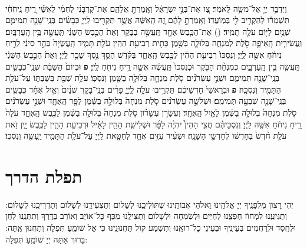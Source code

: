 \documentclass[twoside, openany, parskip=half, 11pt]{book}
\begin{document}
\begin{footnotesize}
\begin{multicols}{2}
\\
וַיְדַבֵּ֥ר יְיָ֖ אֶל־משֶׂ֥ה לֵּאמֹֽר׃ צַ֚ו אֶת־בְּנֵ֣י יִשְׂרָאֵ֔ל וְאָֽמַרְתָּ֖ אֲלֵהֶ֑ם אֶת־קָרְבָּנִ֨י לַחְמִ֜י לְאִשַּׁ֗י רֵ֚יחַ נִֽיחֹחִ֔י תִּשְׁמְר֕וּ לְהַקְרִ֥יב לִ֖י בְּמֽוֹעֲדֽוֹ׃ 
 וְאָֽמַרְתָּ֣ לָהֶ֔ם זֶ֚ה הָֽאִשֶּׁ֔ה אֲשֶׁ֥ר תַּקְרִ֖יבוּ לַֽיְיָ֑ כְּבָשִׂ֨ים בְּנֵֽי־שָׁנָ֧ה תְמִימִ֛ם שְׁנַ֥יִם לַיּ֖וֹם עֹלָ֥ה תָמִֽיד׃ 
 ()
 אֶת־הַכֶּ֥בֶשׂ אֶחָ֖ד תַּֽעֲשֶׂ֣ה בַבֹּ֑קֶר וְאֵת֙ הַכֶּ֣בֶשׂ הַשֵּׁנִ֔י תַּֽעֲשֶׂ֖ה בֵּ֥ין הָֽעַרְבָּֽיִם׃ וַֽעֲשִׂירִ֧ית הָֽאֵיפָ֛ה סֹ֖לֶת לְמִנְחָ֑ה בְּלוּלָ֛ה בְּשֶׁ֥מֶן כָּתִ֖ית רְבִיעִ֥ת הַהִֽין׃ 
 עֹלַ֖ת תָּמִ֑יד הָֽעֲשֻׂיָה֙ בְּהַ֣ר סִינַ֔י לְרֵ֣יחַ נִיחֹ֔חַ אִשֶּׁ֖ה לַֽיְיָ׃ וְנִסְכּוֹ֙ רְבִיעִ֥ת הַהִ֔ין לַכֶּ֖בֶשׂ הָֽאֶחָ֑ד בַּקֹּ֗דֶשׁ הַסֵּ֛ךְ נֶ֥סֶךְ שֵׁכָ֖ר לַֽיְיָ׃ וְאֵת֙ הַכֶּ֣בֶשׂ הַשֵּׁנִ֔י תַּֽעֲשֶׂ֖ה בֵּ֣ין הָֽעַרְבָּ֑יִם כְּמִנְחַ֨ת הַבֹּ֤קֶר וּכְנִסְכּוֹ֙ תַּֽעֲשֶׂ֔ה אִשֵּׁ֛ה רֵ֥יחַ נִיחֹ֖חַ לַֽיְיָ׃ \textbf{פ} 
וּבְיוֹם֙ הַשַּׁבָּ֔ת שְׁנֵֽי־כְבָשִׂ֥ים בְּנֵֽי־שָׁנָ֖ה תְּמִימִ֑ם וּשְׁנֵ֣י עֶשְׂרֹנִ֗ים סֹ֧לֶת מִנְחָ֛ה בְּלוּלָ֥ה בַשֶּׁ֖מֶן וְנִסְכּֽוֹ׃ עֹלַ֥ת שַׁבַּ֖ת בְּשַׁבַּתּ֑וֹ עַל־עֹלַ֥ת הַתָּמִ֖יד וְנִסְכָּֽהּ׃ \textbf{פ} 
 וּבְרָאשֵׁי֙ חָדְשֵׁיכֶ֔ם תַּקְרִ֥יבוּ עֹלָ֥ה לַֽיְיָ֑ פָּרִ֨ים בְּנֵֽי־בָקָ֤ר שְׁנַ֨יִם֙ וְאַ֣יִל אֶחָ֔ד כְּבָשִׂ֧ים בְּנֵֽי־שָׁנָ֛ה שִׁבְעָ֖ה תְּמִימִֽם׃ וּשְׁלֹשָׁ֣ה עֶשְׂרֹנִ֗ים סֹ֤לֶת מִנְחָה֙ בְּלוּלָ֣ה בַשֶּׁ֔מֶן לַפָּ֖ר הָֽאֶחָ֑ד וּשְׁנֵ֣י עֶשְׂרֹנִ֗ים סֹ֤לֶת מִנְחָה֙ בְּלוּלָ֣ה בַשֶּׁ֔מֶן לָאַ֖יִל הָֽאֶחָֽד׃ וְעִשָּׂרֹ֣ן עִשָּׂר֗וֹן סֹ֤לֶת מִנְחָה֙ בְּלוּלָ֣ה בַשֶּׁ֔מֶן לַכֶּ֖בֶשׂ הָֽאֶחָ֑ד עֹלָה֙ רֵ֣יחַ נִיחֹ֔חַ אִשֶּׁ֖ה לַֽיְיָ׃ וְנִסְכֵּיהֶ֗ם חֲצִ֣י הַהִין֩ יִהְיֶ֨ה לַפָּ֜ר וּשְׁלִישִׁ֧ת הַהִ֣ין לָאַ֗יִל וּרְבִיעִ֥ת הַהִ֛ין לַכֶּ֖בֶשׂ יָ֑יִן זֹ֣את עֹלַ֥ת חֹ֨דֶשׁ֙ בְּחָדְשׁ֔וֹ לְחָדְשֵׁ֖י הַשָּׁנָֽה׃ וּשְׂעִ֨יר עִזִּ֥ים אֶחָ֛ד לְחַטָּ֖את לַֽיְיָ עַל־עֹלַ֧ת הַתָּמִ֛יד יֵֽעָשֶׂ֖ה וְנִסְכּֽוֹ׃

\end{multicols}

\end{footnotesize}

\chapter{תפלת הדרך}

יְהִי רָצוֹן מִלְּפָנֶֽיךָ יְיָ אֱלֹהֵֽינוּ וֵאלֹהֵי אֲבוֹתֵֽינוּ שֶׁתּוֹלִיכֵֽנוּ לְשָׁלוֹם וְתַצְעִידֵֽנוּ לְשָׁלוֹם וְתַדְרִיכֵֽנוּ לְשָׁלוֹם: וְתַגִּיעֵֽנוּ לִמְחוֹז חֶפְצֵֽנוּ לְחַיִּים וּלְשִׂמְחָה וּלְשָׁלוֹם וְתַצִּילֵֽנוּ מִכַּף כָּל־אוֹיֵב וְאוֹרֵב בַּדֶּֽרֶךְ וְתִתְּנֵֽנוּ לְחֵן וּלְחֶֽסֶד וּלְרַחֲמִים בְּעֵינֶֽיךָ וּבְעֵינֵי כָל־רוֹאֵֽנוּ וְתִשְׁמַע קוֹל תַּחֲנוּנֵֽינוּ כִּי אֵל שׁוֹמֵֽעַ תְּפִלָה וְתַחֲנוּן אַֽתָּה: בָּרוּךְ אַתָּה יְיָ שׁוֹמֵֽעַ תְּפִלָּה:\\

\clearpage

\blankpage
\end{document}
